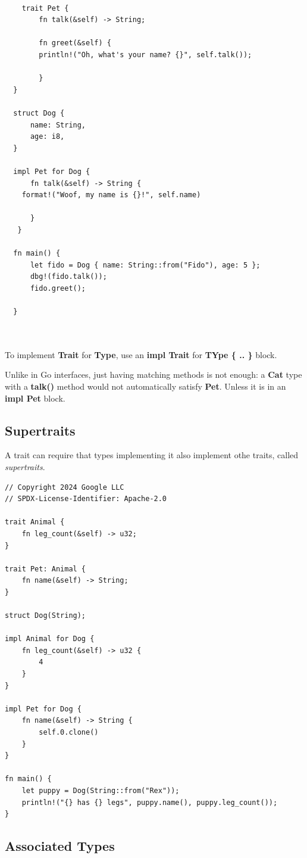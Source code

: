 \documentclass[11pt]{article}
\begin{document}
\begin{verbatim}

    trait Pet {
        fn talk(&self) -> String;

        fn greet(&self) {
    	println!("Oh, what's your name? {}", self.talk());
    	
        }
  }

  struct Dog {
      name: String,
      age: i8,
  }

  impl Pet for Dog {
      fn talk(&self) -> String {
  	format!("Woof, my name is {}!", self.name)
  	    
      }
   }

  fn main() {
      let fido = Dog { name: String::from("Fido"), age: 5 };
      dbg!(fido.talk());
      fido.greet();
      
  }



\end{verbatim}

To implement \textbf{Trait} for \textbf{Type}, use an \textbf{impl Trait} for \textbf{TYpe \{ .. \}} block.

Unlike in Go interfaces, just having matching methods is not enough: a \textbf{Cat} type with a \textbf{talk()} method would not automatically satisfy \textbf{Pet}. Unless it is in an \textbf{impl Pet} block.
\subsection{Supertraits}
\label{sec:org504080d}

A trait can require that types implementing it also implement othe traits, called \emph{supertraits}.

\begin{verbatim}
// Copyright 2024 Google LLC
// SPDX-License-Identifier: Apache-2.0

trait Animal {
    fn leg_count(&self) -> u32;
}

trait Pet: Animal {
    fn name(&self) -> String;
}

struct Dog(String);

impl Animal for Dog {
    fn leg_count(&self) -> u32 {
        4
    }
}

impl Pet for Dog {
    fn name(&self) -> String {
        self.0.clone()
    }
}

fn main() {
    let puppy = Dog(String::from("Rex"));
    println!("{} has {} legs", puppy.name(), puppy.leg_count());
}
\end{verbatim}
\subsection{Associated Types}
\label{sec:org57b8282}
\end{document}
